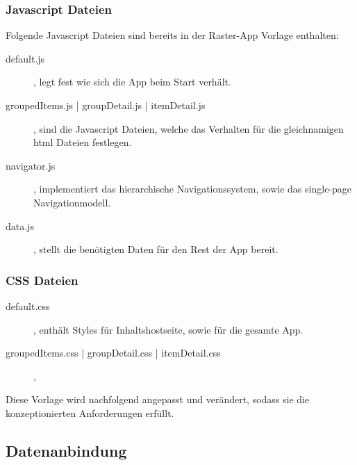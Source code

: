 \documentclass[12pt,a4paper]{scrartcl}
\begin{document}
\subsubsection{Javascript Dateien}
\label{subsubsec:javascriptdateien} 
Folgende Javascript Dateien sind bereits in der Raster-App Vorlage enthalten:
\begin{description}
	\item[default.js], legt fest wie sich die App beim Start verhält.
	\item[groupedItems.js | groupDetail.js | itemDetail.js], sind die Javascript Dateien, welche das Verhalten für die gleichnamigen \ac{html} Dateien festlegen.
	\item[navigator.js], implementiert das hierarchische Navigationssystem, sowie das single-page Navigationmodell.
	\item[data.js], stellt die benötigten Daten für den Rest der App bereit.
\end{description}

\subsubsection{CSS Dateien}
\label{subsubsec:cssdateien} 
\begin{description}
	\item[default.css], enthält Styles für Inhaltshostseite, sowie für die gesamte App.
	\item[groupedItems.css | groupDetail.css | itemDetail.css], 
\end{description}
Diese Vorlage wird nachfolgend angepasst und verändert, sodass sie die konzeptionierten Anforderungen erfüllt.

\subsection{Datenanbindung}
\label{subsec:datenanbindung}
\end{document}
